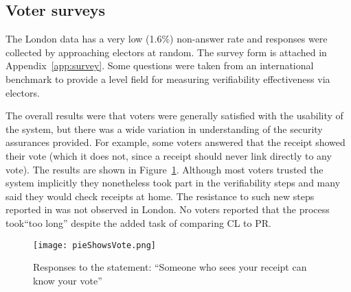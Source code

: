 \documentclass[twocolumn]{article}
\begin{document}
\subsection*{Voter surveys}

The London data has a very low (1.6\%) non-answer rate and responses were collected by approaching electors at random.  The survey form is attached in Appendix~\ref{app:survey}.  Some questions were taken from an international benchmark\cite{DBLP:conf/stast/KarayumakKOVV11} to provide a level field for measuring verifiability effectiveness via electors.

The overall results were that voters were generally satisfied with the usability of the system, but there was a wide variation in understanding of the security assurances provided.  For example, some voters answered that the receipt showed their vote (which it does not, since a receipt should never link directly to any vote).  The results are shown in Figure~\ref{fig:shows}.  Although most voters trusted the system implicitly they nonetheless took part in the verifiability steps and many said they would check receipts at home.  The resistance to such new steps reported in \cite{DBLP:conf/stast/KarayumakKOVV11}  was not observed in London.  No voters reported that the process took``too long'' despite the added task of comparing CL to PR. 

\begin{figure}
\begin{center}
\texttt{[image: pieShowsVote.png]}
\end{center}
\caption{Responses to the statement: ``Someone who sees your receipt can know your vote''} 
\label{fig:shows}
\end{figure}
\end{document}

